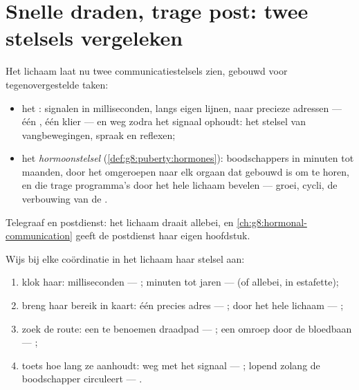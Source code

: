 \section{Snelle draden, trage post: twee stelsels vergeleken}

\begin{proposition}\label{prop:g8:nervous-communication:compare}
Het lichaam laat nu twee communicatiestelsels zien, gebouwd voor
tegenovergestelde taken:
\begin{itemize}
  \item het \emph{}: signalen in milliseconden, langs eigen
        lijnen, naar precieze adressen --- één , één klier --- en weg
        zodra het signaal ophoudt: het stelsel van vangbewegingen, spraak
        en reflexen;
  \item het \emph{hormoonstelsel}
        (\cref{def:g8:puberty:hormones}): boodschappers in minuten tot
        maanden, door het  omgeroepen naar elk orgaan dat gebouwd is
        om te horen, en die trage programma's door het hele lichaam
        bevelen --- groei, cycli, de verbouwing van de .
\end{itemize}
Telegraaf en postdienst: het lichaam draait allebei, en
\cref{ch:g8:hormonal-communication} geeft de postdienst haar eigen
hoofdstuk.
\end{proposition}
\admitted

\begin{method}\label{met:g8:nervous-communication:diagnose}
Wijs bij elke coördinatie in het lichaam haar stelsel aan:
\begin{enumerate}
  \item klok haar: milliseconden --- ; minuten tot jaren ---
         (of allebei, in estafette);
  \item breng haar bereik in kaart: één precies adres --- ; door
        het hele lichaam --- ;
  \item zoek de route: een te benoemen draadpad --- ; een omroep
        door de bloedbaan --- ;
  \item toets hoe lang ze aanhoudt: weg met het signaal --- ;
        lopend zolang de boodschapper circuleert --- .
\end{enumerate}
\end{method}

